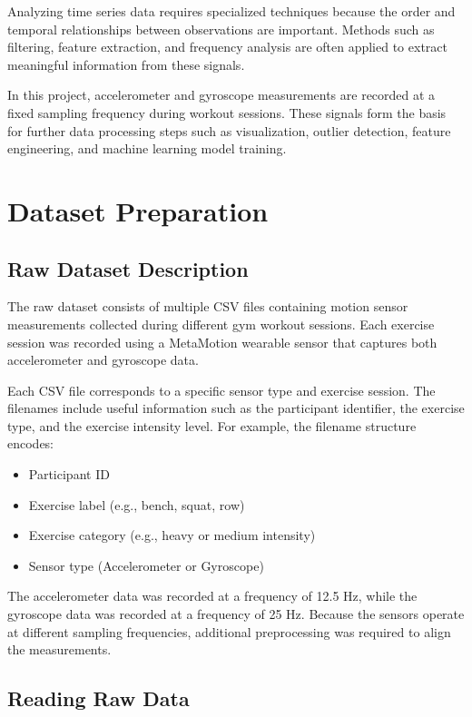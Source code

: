 \documentclass[12pt,a4paper]{article}
\begin{document}
Analyzing time series data requires specialized techniques because the order and temporal relationships between observations are important. Methods such as filtering, feature extraction, and frequency analysis are often applied to extract meaningful information from these signals.

In this project, accelerometer and gyroscope measurements are recorded at a fixed sampling frequency during workout sessions. These signals form the basis for further data processing steps such as visualization, outlier detection, feature engineering, and machine learning model training.
\section{Dataset Preparation}

\subsection{Raw Dataset Description}

The raw dataset consists of multiple CSV files containing motion sensor measurements collected during different gym workout sessions. Each exercise session was recorded using a MetaMotion wearable sensor that captures both accelerometer and gyroscope data.

Each CSV file corresponds to a specific sensor type and exercise session. The filenames include useful information such as the participant identifier, the exercise type, and the exercise intensity level. For example, the filename structure encodes:

\begin{itemize}
\item Participant ID
\item Exercise label (e.g., bench, squat, row)
\item Exercise category (e.g., heavy or medium intensity)
\item Sensor type (Accelerometer or Gyroscope)
\end{itemize}

The accelerometer data was recorded at a frequency of 12.5 Hz, while the gyroscope data was recorded at a frequency of 25 Hz. Because the sensors operate at different sampling frequencies, additional preprocessing was required to align the measurements.

\subsection{Reading Raw Data}
\end{document}
